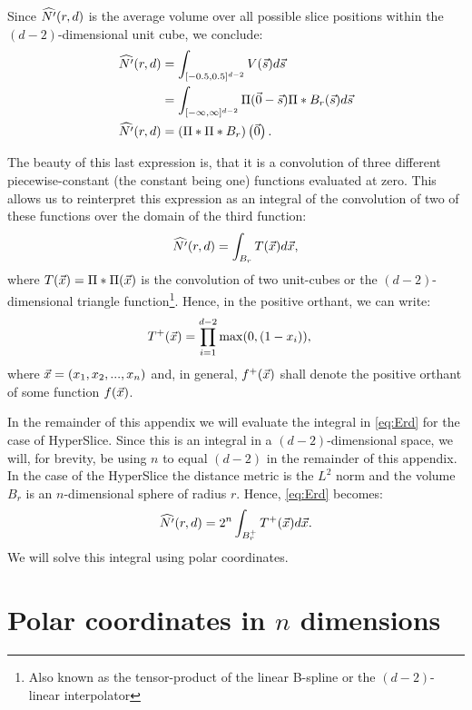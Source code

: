 Since $\widehat{N'}(r, d)$ is the average volume over all possible slice positions within the $(d-2)$-dimensional unit cube, we conclude:
\begin{align*}
  \widehat{N'}(r, d) &= \int_{[-0.5,0.5]^{d-2}} V(\vec{s}) d\vec{s} \\
  	&= \int_{[-\infty,\infty]^{d-2}} \Pi(\vec{0}-\vec{s}) \Pi * B_r(\vec{s}) d\vec{s} \\
  \widehat{N'}(r, d) &= \left( \Pi * \Pi * B_r \right) \left(\vec{0}\right) \text{.}
\end{align*}

The beauty of this last expression is, that it is a convolution of three different piecewise-constant (the constant being one) functions evaluated at zero. This allows us to reinterpret this expression as an integral of the convolution of two of these functions over the domain of the third function:
\begin{equation}
  \widehat{N'}(r, d) = \int_{B_r} T(\vec{x}) d\vec{x} \text{,}
  \label{eq:Erd}
\end{equation}
where $T(\vec{x}) = \Pi * \Pi (\vec{x})$ is the convolution of two unit-cubes or the $(d-2)$-dimensional triangle function\footnote{Also known as the tensor-product of the linear B-spline or the $(d-2)$-linear interpolator}. Hence, in the positive orthant, we can write:
\begin{align*}
  T^{+}(\vec{x}) &= \prod_{i=1}^{d-2} \max(0,(1-x_i)) \text{,}
\end{align*}
where $\vec{x} = (x_1, x_2, ..., x_n)$ and, in general, $f^{+}(\vec{x})$ shall denote the positive orthant of some function $f(\vec{x})$.


In the remainder of this appendix we will evaluate the integral in \autoref{eq:Erd} for the case of HyperSlice. Since this is an integral in a $(d-2)$-dimensional space, we will, for brevity, be using $n$ to equal $(d-2)$ in the remainder of this appendix.
In the case of the HyperSlice the distance metric is the $L^2$ norm and the volume $B_r$ is an $n$-dimensional sphere of radius $r$. Hence, \autoref{eq:Erd} becomes:
\begin{equation}
  \widehat{N'}(r, d) = 2^n \int_{B^{+}_r} T^{+}(\vec{x}) d\vec{x} \text{.}
  \label{eq:ErdConvH}
\end{equation}
We will solve this integral using polar coordinates.

\section{Polar coordinates in $n$ dimensions}


